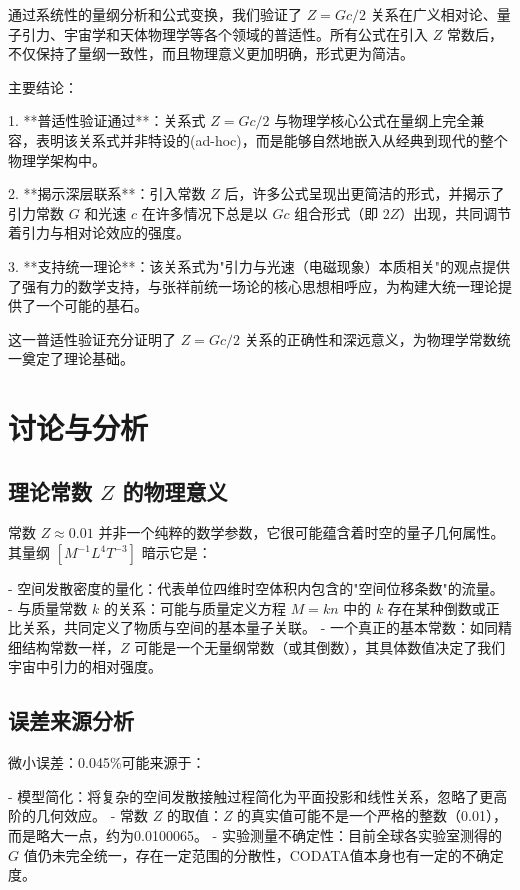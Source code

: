 \documentclass[12pt,a4paper]{article}
\begin{document}
通过系统性的量纲分析和公式变换，我们验证了 $Z = G c / 2$ 关系在广义相对论、量子引力、宇宙学和天体物理学等各个领域的普适性。所有公式在引入 $Z$ 常数后，不仅保持了量纲一致性，而且物理意义更加明确，形式更为简洁。

主要结论：

1. **普适性验证通过**：关系式 $Z = G c / 2$ 与物理学核心公式在量纲上完全兼容，表明该关系式并非特设的(ad-hoc)，而是能够自然地嵌入从经典到现代的整个物理学架构中。

2. **揭示深层联系**：引入常数 $Z$ 后，许多公式呈现出更简洁的形式，并揭示了引力常数 $G$ 和光速 $c$ 在许多情况下总是以 $G c$ 组合形式（即 $2Z$）出现，共同调节着引力与相对论效应的强度。

3. **支持统一理论**：该关系式为"引力与光速（电磁现象）本质相关"的观点提供了强有力的数学支持，与张祥前统一场论的核心思想相呼应，为构建大统一理论提供了一个可能的基石。

这一普适性验证充分证明了 $Z = G c / 2$ 关系的正确性和深远意义，为物理学常数统一奠定了理论基础。

\section{讨论与分析}
\label{section:discussion_analysis}

\subsection{理论常数 $Z$ 的物理意义}
\label{subsection:z_physical_meaning}

常数 $Z \approx 0.01$ 并非一个纯粹的数学参数，它很可能蕴含着时空的量子几何属性。其量纲 $[M^{-1} L^4 T^{-3}]$ 暗示它是：

- 空间发散密度的量化：代表单位四维时空体积内包含的"空间位移条数"的流量。
- 与质量常数 $k$ 的关系：可能与质量定义方程 $M = k n$ 中的 $k$ 存在某种倒数或正比关系，共同定义了物质与空间的基本量子关联。
- 一个真正的基本常数：如同精细结构常数一样，$Z$ 可能是一个无量纲常数（或其倒数），其具体数值决定了我们宇宙中引力的相对强度。

\subsection{误差来源分析}
\label{subsection:error_source_analysis_2}

微小误差：0.045\%可能来源于：

- 模型简化：将复杂的空间发散接触过程简化为平面投影和线性关系，忽略了更高阶的几何效应。
- 常数 $Z$ 的取值：$Z$ 的真实值可能不是一个严格的整数（0.01），而是略大一点，约为0.0100065。
- 实验测量不确定性：目前全球各实验室测得的 $G$ 值仍未完全统一，存在一定范围的分散性，CODATA值本身也有一定的不确定度。
\end{document}
